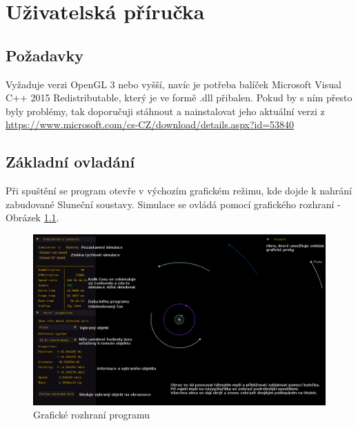 \chapter{Uživatelská příručka}
\label{chap:userGuide}
\section{Požadavky}
Vyžaduje verzi OpenGL 3 nebo vyšší, navíc je potřeba balíček Microsoft Visual C++ 2015 Redistributable, který je ve formě .dll přibalen. Pokud by s ním přesto byly problémy, tak doporučuji stáhnout  a nainstalovat jeho aktuální verzi z \url{https://www.microsoft.com/cs-CZ/download/details.aspx?id=53840}
\section{Základní ovladání}
Při spuštění se program otevře v výchozím grafickém režimu, kde dojde k nahrání zabudované Sluneční soustavy. Simulace se ovládá pomocí grafického rozhraní - Obrázek \ref{fig:GUI1}.\\
\begin{figure}
	\caption{Grafické rozhraní programu}
	\label{fig:GUI1} 
	\centering
	\includegraphics[scale=0.5]{Figs/GUI1_edited}
\end{figure}
\FloatBarrier
